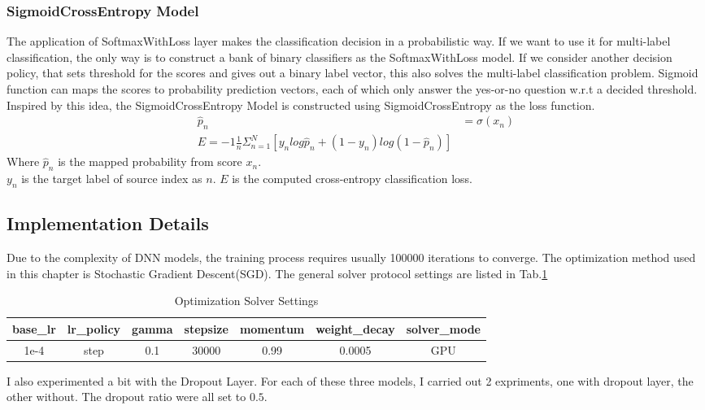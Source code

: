 \subsubsection{SigmoidCrossEntropy Model}
The application of SoftmaxWithLoss layer makes the classification decision in a probabilistic way. If we want to use it for multi-label classification, the only way is to construct a bank of binary classifiers as the SoftmaxWithLoss model. If we consider another decision policy, that sets threshold for the scores and gives out a binary label vector, this also solves the multi-label classification problem. Sigmoid function can maps the scores to probability prediction vectors, each of which only answer the yes-or-no question w.r.t a decided threshold. Inspired by this idea, the SigmoidCrossEntropy Model is constructed using SigmoidCrossEntropy as the loss function. 
\begin{align}
\hat{p}_n &=\sigma(x_n) \\
E = -1\frac{1}{n}\Sigma_{n=1}^{N}[y_nlog\hat{p}_n+(1-y_n)log(1-\hat{p}_n)]
\end{align}
Where $\hat{p}_{n}$ is the mapped probability from score $x_n$.\\
$y_n$ is the target label of source index as $n$.
$E$ is the computed cross-entropy classification loss. 
\subsection{Implementation Details}
Due to the complexity of DNN models, the training process requires usually 100000 iterations to converge. The optimization method used in this chapter is Stochastic Gradient Descent(SGD). The general solver protocol settings are listed in Tab.\ref{tab:solversetting}
\begin{table}[h!]
	\begin{tabular}{|c|c|c|c|c|c|c|}
		\hline base\_lr & lr\_policy & gamma & stepsize & momentum & weight\_decay & solver\_mode \\ 
		\hline 1e-4 & step & 0.1 & 30000 & 0.99 & 0.0005  & GPU \\ 
		\hline 
	\end{tabular} 
	\label{tab:solversetting}
	\caption{Optimization Solver Settings}
\end{table}
I also experimented a bit with the Dropout Layer. For each of these three models, I carried out 2 expriments, one with dropout layer, the other without. The dropout ratio were all set to $0.5$.

